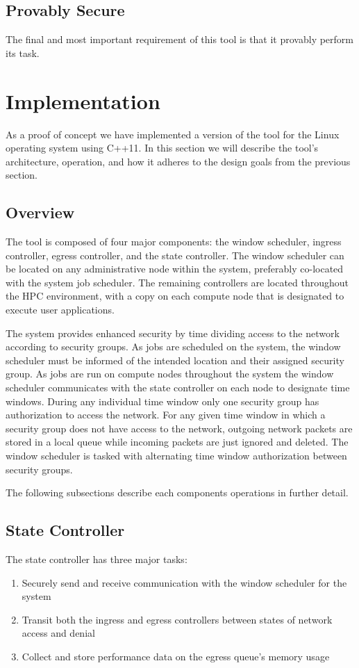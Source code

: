 \documentclass{article}
\begin{document}
\subsection{Provably Secure}
The final and most important requirement of this tool is that it provably perform its task. 
\section{Implementation}
As a proof of concept we have implemented a version of the tool for the Linux operating system using C++11. In this section we will describe the tool's architecture, operation, and how it adheres to the design goals from the previous section.
\subsection{Overview}
The tool is composed of four major components:  the window scheduler, ingress controller, egress controller, and the state controller. The window scheduler can be located on any administrative node within the system, preferably co-located with the system job scheduler. The remaining controllers are located throughout the HPC environment, with a copy on each compute node that is designated to execute user applications. 

The system provides enhanced security by time dividing access to the network according to security groups. As jobs are scheduled on the system, the window scheduler must be informed of the intended location and their assigned security group. As jobs are run on compute nodes throughout the system the window scheduler communicates with the state controller on each node to designate time windows. During any individual time window only one security group has authorization to access the network. For any given time window in which a security group does not have access to the network, outgoing network packets are stored in a local queue while incoming packets are just ignored and deleted. The window scheduler is tasked with alternating time window authorization between security groups.

The following subsections describe each components operations in further detail. 
\subsection{State Controller}
The state controller has three major tasks:
\begin{enumerate} \itemsep1pt \parskip0pt 
\item Securely send and receive communication with the window scheduler for the system
\item Transit both the ingress and egress controllers between states of network access and denial
\item Collect and store performance data on the egress queue's memory usage
\end{enumerate}
\end{document}
